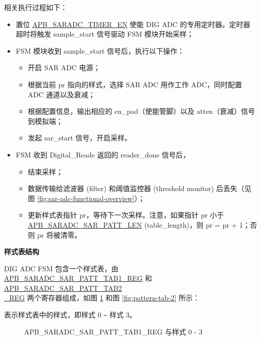 \documentclass[main\_\_CN.tex]{subfiles}
\begin{document}
相关执行过程如下：
\begin{itemize}
\item 置位 \hyperref[fielddesc:APBSARADCSARADCTIMEREN]{APB\_SARADC\_TIMER\_EN} 使能 DIG ADC 的专用定时器。定时器超时将触发 sample\_start 信号驱动 FSM 模块开始采样；
\item FSM 模块收到 sample\_start 信号后，执行以下操作：
\begin{itemize}
    \item 开启 SAR ADC 电源；
    \item 根据当前 pr 指向的样式，选择 SAR ADC 用作工作 ADC，同时配置 ADC 通道以及衰减；
    \item 根据配置信息，输出相应的 en\_pad（使能管脚）以及 atten（衰减）信号到模拟端；
    \item 发起 sar\_start 信号，开启采样。
\end{itemize}

    \item FSM 收到 Digital\_Reade 返回的 reader\_done 信号后，
    \begin{itemize}
        \item 结束采样；
        \item 数据传输给滤波器 (filter) 和阈值监控器 (threshold monitor) 后丢失（见图 \ref{fig:sar-adc-functional-overview}）；
        \item 更新样式表指针 pr，等待下一次采样。注意，如果指针 pr 小于 \hyperref[fielddesc:APBSARADCSARADCSARPATTLEN]{APB\_SARADC\_SAR\_PATT\_LEN} (table\_length)，则 pr = pr + 1；否则 pr 将被清零。
    \end{itemize}
\end{itemize}

\textbf{样式表结构}

DIG ADC FSM 包含一个样式表，由 \hyperref[regdesc:APBSARADCSARPATTTAB1REG]{APB\_SARADC\_SAR\_PATT\_TAB1\_REG} 和 \hyperref[regdesc:APBSARADCSARPATTTAB1REG]{APB\_SARADC\_SAR\_PATT\_TAB2\\\_REG} 两个寄存器组成，如图 \ref{fig:pattern-tab-1} 和图 \ref{fig:pattern-tab-2} 所示：

%
%
%
%
%
\begin{regdesc}\begin{reglist}
\item [cmd \regindex{x}] 表示样式表中的样式，即样式 0 \verb+~+ 样式 3。
\end{reglist}\end{regdesc}
\vspace{-2em}
\begin{figure}[H]
    \centering
    \caption{APB\_SARADC\_SAR\_PATT\_TAB1\_REG 与样式 0 - 3}
    \label{fig:pattern-tab-1}
\end{figure}
\end{document}
